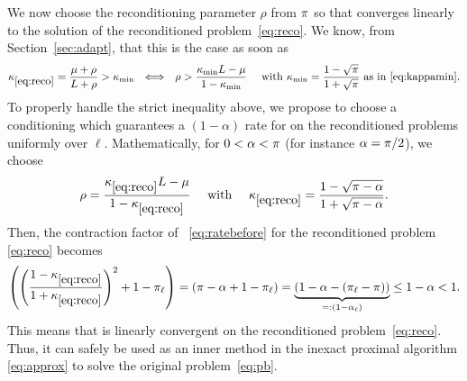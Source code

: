 We now choose the reconditioning parameter $\rho$ from $\pi$ so that \salgo converges linearly to the solution of the reconditioned problem~\eqref{eq:reco}. We know, from Section~\ref{sec:adapt}, that this is the case as soon as
\begin{align*}
   \kappa_{\eqref{eq:reco}} = \frac{\mu + \rho}{L+\rho}  > \kappa_{\min} ~~\Longleftrightarrow~~  \rho > \frac{\kappa_{\min}L-\mu}{1-\kappa_{\min}} \quad\text{ with } \kappa_{\min} = \frac{1-\sqrt{\pi}}{1+\sqrt{\pi}}
   \text{~as in~\eqref{eq:kappamin}}.
\end{align*}
To properly handle the strict inequality above, we propose to choose a conditioning which guarantees a $(1-\alpha)$ rate for \salgo on the reconditioned problems uniformly over $\ell$. Mathematically, for $0<\alpha<\pi$ (for instance $\alpha=\pi/2$), we choose
\begin{align}
\label{eq:rho}
    \rho = \frac{\kappa_{\eqref{eq:reco}} L-\mu}{1-\kappa_{\eqref{eq:reco}}} \quad\text{ with }\quad \kappa_{\eqref{eq:reco}} = \frac{1-\sqrt{\pi-\alpha}}{1+\sqrt{\pi-\alpha}} .
\end{align}
Then, the contraction factor of \salgo~\eqref{eq:ratebefore} for the reconditioned problem \eqref{eq:reco} becomes
\begin{align}
\label{eq:reco_contra}
     \left( \left(\frac{1-\kappa_{\eqref{eq:reco}}}{1+\kappa_{\eqref{eq:reco}}}\right)^2 + 1 - \pi_\ell  \right) =  \left( \pi - \alpha + 1 - \pi_\ell  \right) = \underbrace{(1 - \alpha - (\pi_\ell - \pi) )}_{=: (1-\alpha_\ell)} \leq 1-\alpha < 1 .
\end{align}
This means that \salgo is linearly convergent on the reconditioned problem~\eqref{eq:reco}. Thus, it can safely be used as an inner method in the inexact proximal algorithm \eqref{eq:approx} to solve the original problem~\eqref{eq:pb}. 

